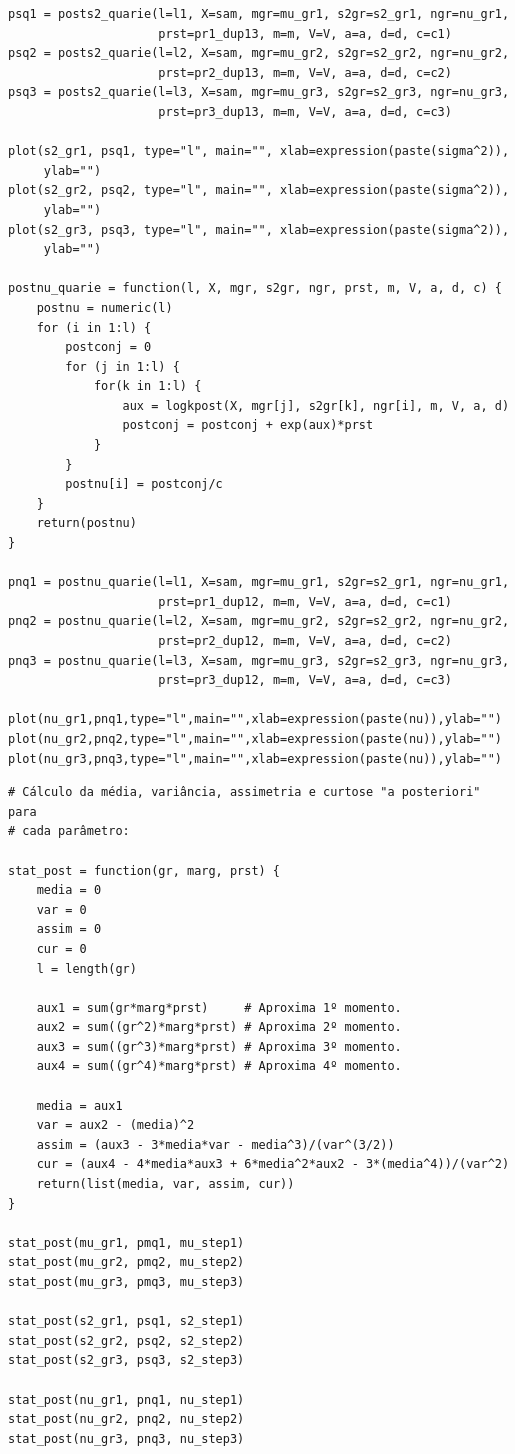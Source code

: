 \documentclass[12pt,reqno,a4paper,oneside]{article}
\begin{document}
\begin{verbatim}
psq1 = posts2_quarie(l=l1, X=sam, mgr=mu_gr1, s2gr=s2_gr1, ngr=nu_gr1,
					 prst=pr1_dup13, m=m, V=V, a=a, d=d, c=c1)
psq2 = posts2_quarie(l=l2, X=sam, mgr=mu_gr2, s2gr=s2_gr2, ngr=nu_gr2,
					 prst=pr2_dup13, m=m, V=V, a=a, d=d, c=c2)
psq3 = posts2_quarie(l=l3, X=sam, mgr=mu_gr3, s2gr=s2_gr3, ngr=nu_gr3,
					 prst=pr3_dup13, m=m, V=V, a=a, d=d, c=c3)

plot(s2_gr1, psq1, type="l", main="", xlab=expression(paste(sigma^2)),
	 ylab="")
plot(s2_gr2, psq2, type="l", main="", xlab=expression(paste(sigma^2)),
	 ylab="")
plot(s2_gr3, psq3, type="l", main="", xlab=expression(paste(sigma^2)), 
	 ylab="")

postnu_quarie = function(l, X, mgr, s2gr, ngr, prst, m, V, a, d, c) {
	postnu = numeric(l)
	for (i in 1:l) {
		postconj = 0
		for (j in 1:l) {
			for(k in 1:l) {
				aux = logkpost(X, mgr[j], s2gr[k], ngr[i], m, V, a, d)
				postconj = postconj + exp(aux)*prst
			}
		}
		postnu[i] = postconj/c
	}
	return(postnu)
}

pnq1 = postnu_quarie(l=l1, X=sam, mgr=mu_gr1, s2gr=s2_gr1, ngr=nu_gr1,
					 prst=pr1_dup12, m=m, V=V, a=a, d=d, c=c1)
pnq2 = postnu_quarie(l=l2, X=sam, mgr=mu_gr2, s2gr=s2_gr2, ngr=nu_gr2,
					 prst=pr2_dup12, m=m, V=V, a=a, d=d, c=c2)
pnq3 = postnu_quarie(l=l3, X=sam, mgr=mu_gr3, s2gr=s2_gr3, ngr=nu_gr3,
					 prst=pr3_dup12, m=m, V=V, a=a, d=d, c=c3)

plot(nu_gr1,pnq1,type="l",main="",xlab=expression(paste(nu)),ylab="")
plot(nu_gr2,pnq2,type="l",main="",xlab=expression(paste(nu)),ylab="")
plot(nu_gr3,pnq3,type="l",main="",xlab=expression(paste(nu)),ylab="")
\end{verbatim}

\newpage

\begin{verbatim}
# Cálculo da média, variância, assimetria e curtose "a posteriori" para
# cada parâmetro:

stat_post = function(gr, marg, prst) {
	media = 0
	var = 0
	assim = 0
	cur = 0
	l = length(gr)
	
	aux1 = sum(gr*marg*prst)     # Aproxima 1º momento.
	aux2 = sum((gr^2)*marg*prst) # Aproxima 2º momento.
	aux3 = sum((gr^3)*marg*prst) # Aproxima 3º momento.
	aux4 = sum((gr^4)*marg*prst) # Aproxima 4º momento.
	
	media = aux1
	var = aux2 - (media)^2
	assim = (aux3 - 3*media*var - media^3)/(var^(3/2))
	cur = (aux4 - 4*media*aux3 + 6*media^2*aux2 - 3*(media^4))/(var^2)
	return(list(media, var, assim, cur))
}

stat_post(mu_gr1, pmq1, mu_step1)
stat_post(mu_gr2, pmq2, mu_step2)
stat_post(mu_gr3, pmq3, mu_step3)

stat_post(s2_gr1, psq1, s2_step1)
stat_post(s2_gr2, psq2, s2_step2)
stat_post(s2_gr3, psq3, s2_step3)

stat_post(nu_gr1, pnq1, nu_step1)
stat_post(nu_gr2, pnq2, nu_step2)
stat_post(nu_gr3, pnq3, nu_step3)

\end{verbatim}
\end{document}

